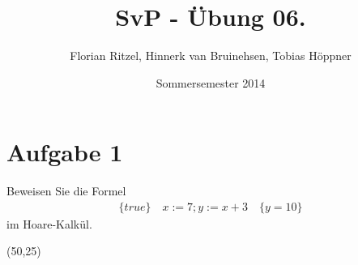\documentclass[ngerman,a4paper]{report}
\author{Florian Ritzel, Hinnerk van Bruinehsen, Tobias Höppner}
\title{SvP - Übung 06. }
\date{Sommersemester 2014}
\renewcommand{\maketitle}{}
\begin{document}
\maketitle
\section*{Aufgabe 1}
Beweisen Sie die Formel
\begin{align*}
\{true\}\quad
x:=7;y:=x+3\quad
\{y=10\}
\end{align*}
im Hoare-Kalkül.\\
%
\begin{struktogramm}(50,25)
\end{struktogramm}\\
\end{document}
